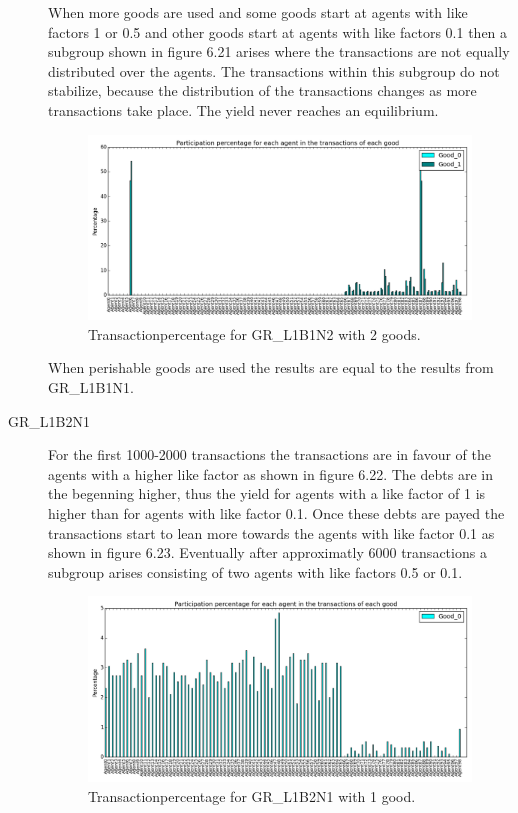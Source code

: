 \documentclass[twoside,openright]{uva-bachelor-thesis}
\begin{document}
\begin{description}
When more goods are used and some goods start at agents with like factors 1 or 0.5 and other goods start at agents with like factors 0.1 then a subgroup shown in figure 6.21 arises where the transactions are not equally distributed over the agents. The transactions within this subgroup do not stabilize, because the distribution of the transactions changes as more transactions take place. The yield never reaches an equilibrium. \\
\begin{figure}[h!]
  \centering
\includegraphics[scale=0.4]{Simulation_figures/GR_L1B1N2/2goods_spikes}
  \caption{Transactionpercentage for GR\_L1B1N2 with 2 goods.}
\end{figure}

When perishable goods are used the results are equal to the results from GR\_L1B1N1.
\clearpage
\item[GR\_L1B2N1] For the first 1000-2000 transactions the transactions are in favour of the agents with a higher like factor as shown in figure 6.22. The debts are in the begenning higher, thus the yield for agents with a like factor of 1 is higher than for agents with like factor 0.1. Once these debts are payed the transactions start to lean more towards the agents with like factor 0.1 as shown in figure 6.23. Eventually after approximatly 6000 transactions a subgroup arises consisting of two agents with like factors 0.5 or 0.1.
\begin{figure}[h!]
  \centering
\includegraphics[scale=0.4]{Simulation2_figures/GR_L1B2N1_1good_2k} 
  \caption{Transactionpercentage for GR\_L1B2N1 with 1 good.}
\end{figure}


\end{description}
\end{document}
